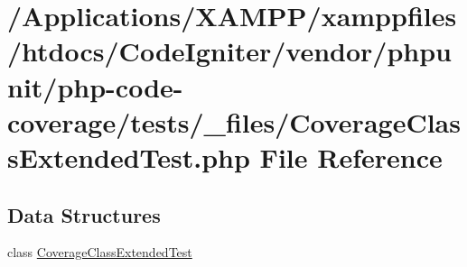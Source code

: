 \hypertarget{php-code-coverage_2tests_2__files_2_coverage_class_extended_test_8php}{}\section{/\+Applications/\+X\+A\+M\+P\+P/xamppfiles/htdocs/\+Code\+Igniter/vendor/phpunit/php-\/code-\/coverage/tests/\+\_\+files/\+Coverage\+Class\+Extended\+Test.php File Reference}
\label{php-code-coverage_2tests_2__files_2_coverage_class_extended_test_8php}
\subsection*{Data Structures}
\begin{DoxyCompactItemize}
\item 
class \mbox{\hyperlink{class_coverage_class_extended_test}{Coverage\+Class\+Extended\+Test}}
\end{DoxyCompactItemize}

